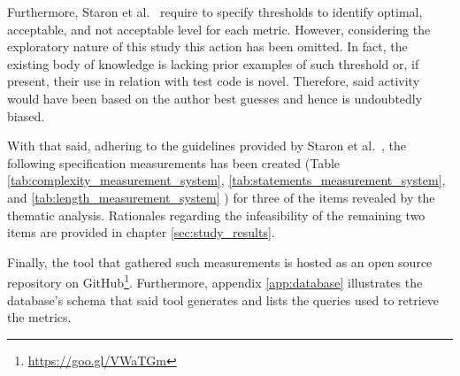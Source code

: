     Furthermore, Staron et al.\ \cite{metrics_paper} require to specify thresholds to identify optimal, acceptable, and not acceptable level for each metric. However, considering the exploratory nature of this study this action has been omitted. In fact, the existing body of knowledge is lacking prior examples of such threshold or, if present, their use in relation with test code is novel. Therefore, said activity would have been based on the author best guesses and hence is undoubtedly biased.

    With that said, adhering to the guidelines provided by Staron et al.\ \cite{metrics_paper}, the following specification measurements has been created (Table \ref{tab:complexity_measurement_system}, \ref{tab:statements_measurement_system}, and \ref{tab:length_measurement_system} ) for three of the items revealed by the thematic analysis. Rationales regarding the infeasibility of the remaining two items are provided in chapter \ref{sec:study_results}.

    Finally, the tool that gathered such measurements is hosted as an open source repository on GitHub\footnote{\href{https://goo.gl/VWaTGm}{https://goo.gl/VWaTGm}}. Furthermore, appendix \ref{app:database} illustrates the database's schema that said tool generates and lists the queries used to retrieve the metrics.

